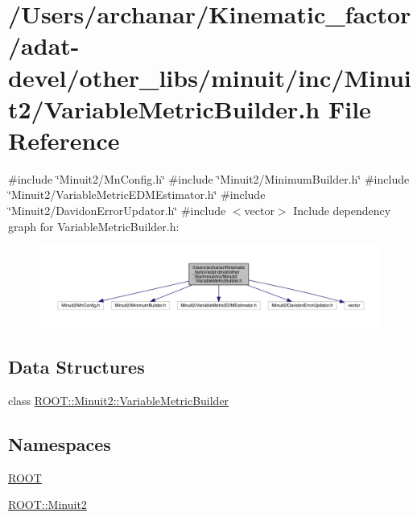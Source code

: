 \hypertarget{adat-devel_2other__libs_2minuit_2inc_2Minuit2_2VariableMetricBuilder_8h}{}\section{/\+Users/archanar/\+Kinematic\+\_\+factor/adat-\/devel/other\+\_\+libs/minuit/inc/\+Minuit2/\+Variable\+Metric\+Builder.h File Reference}
\label{adat-devel_2other__libs_2minuit_2inc_2Minuit2_2VariableMetricBuilder_8h}
{\ttfamily \#include \char`\"{}Minuit2/\+Mn\+Config.\+h\char`\"{}}\newline
{\ttfamily \#include \char`\"{}Minuit2/\+Minimum\+Builder.\+h\char`\"{}}\newline
{\ttfamily \#include \char`\"{}Minuit2/\+Variable\+Metric\+E\+D\+M\+Estimator.\+h\char`\"{}}\newline
{\ttfamily \#include \char`\"{}Minuit2/\+Davidon\+Error\+Updator.\+h\char`\"{}}\newline
{\ttfamily \#include $<$vector$>$}\newline
Include dependency graph for Variable\+Metric\+Builder.\+h\+:
\nopagebreak
\begin{figure}[H]
\begin{center}
\leavevmode
\includegraphics[width=350pt]{d4/d76/adat-devel_2other__libs_2minuit_2inc_2Minuit2_2VariableMetricBuilder_8h__incl}
\end{center}
\end{figure}
\subsection*{Data Structures}
\begin{DoxyCompactItemize}
\item 
class \mbox{\hyperlink{classROOT_1_1Minuit2_1_1VariableMetricBuilder}{R\+O\+O\+T\+::\+Minuit2\+::\+Variable\+Metric\+Builder}}
\end{DoxyCompactItemize}
\subsection*{Namespaces}
\begin{DoxyCompactItemize}
\item 
 \mbox{\hyperlink{namespaceROOT}{R\+O\+OT}}
\item 
 \mbox{\hyperlink{namespaceROOT_1_1Minuit2}{R\+O\+O\+T\+::\+Minuit2}}
\end{DoxyCompactItemize}
